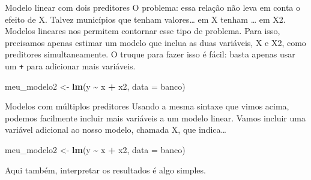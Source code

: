 \documentclass[
  9pt,
  ignorenonframetext,
  aspectratio=169]{beamer}
\newenvironment{Shaded}{\begin{snugshade}}{\end{snugshade}}
\newcommand{\DataTypeTok}[1]{\textcolor[rgb]{0.13,0.29,0.53}{#1}}
\newcommand{\KeywordTok}[1]{\textcolor[rgb]{0.13,0.29,0.53}{\textbf{#1}}}
\newcommand{\NormalTok}[1]{#1}
\newcommand{\OperatorTok}[1]{\textcolor[rgb]{0.81,0.36,0.00}{\textbf{#1}}}
\newcommand{\StringTok}[1]{\textcolor[rgb]{0.31,0.60,0.02}{#1}}
\begin{document}
\begin{frame}[fragile]{Modelo linear com dois preditores}
O problema: essa relação não leva em conta o efeito de X. Talvez
municípios que tenham valores\ldots{} em X tenham \ldots{} em X2.
Modelos lineares nos permitem contornar esse tipo de problema. Para
isso, precisamos apenas estimar um modelo que inclua as duas variáveis,
X e X2, como preditores simultaneamente. O truque para fazer isso é
fácil: basta apenas usar um \texttt{+} para adicionar mais variáveis.

\begin{Shaded}
\begin{Highlighting}[]
\NormalTok{meu\_modelo2 \textless{}{-}}\StringTok{ }\KeywordTok{lm}\NormalTok{(y }\OperatorTok{\textasciitilde{}}\StringTok{ }\NormalTok{x }\OperatorTok{+}\StringTok{ }\NormalTok{x2, }\DataTypeTok{data =}\NormalTok{ banco)}
\end{Highlighting}
\end{Shaded}
\end{frame}

\begin{frame}[fragile]{Modelos com múltiplos preditores}
\protect\hypertarget{modelos-com-muxfaltiplos-preditores}{}
Usando a mesma sintaxe que vimos acima, podemos facilmente incluir mais
variáveis a um modelo linear. Vamos incluir uma variável adicional ao
nosso modelo, chamada X, que indica\ldots{}

\begin{Shaded}
\begin{Highlighting}[]
\NormalTok{meu\_modelo2 \textless{}{-}}\StringTok{ }\KeywordTok{lm}\NormalTok{(y }\OperatorTok{\textasciitilde{}}\StringTok{ }\NormalTok{x }\OperatorTok{+}\StringTok{ }\NormalTok{x2, }\DataTypeTok{data =}\NormalTok{ banco)}
\end{Highlighting}
\end{Shaded}

Aqui também, interpretar os resultados é algo simples.
\end{frame}
\end{document}
